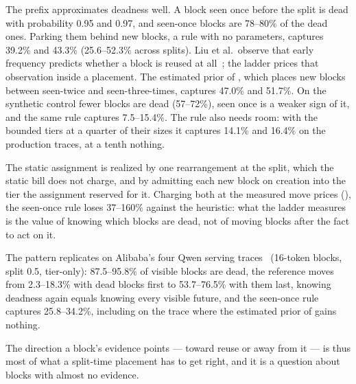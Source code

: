 The prefix approximates deadness well. A block seen once before the split is dead with probability 0.95 and
0.97, and seen-once blocks are 78--80\% of the dead ones. Parking them behind new blocks, a rule with no
parameters, captures 39.2\% and 43.3\% (25.6--52.3\% across splits). Liu et al.\ observe that early
frequency predicts whether a block is reused at all~\cite{liu2026fancyeviction}; the ladder prices that
observation inside a placement. The estimated prior of , which places new blocks
between seen-twice and seen-three-times, captures 47.0\% and 51.7\%. On the synthetic control fewer blocks
are dead (57--72\%), seen once is a weaker sign of it, and the same rule captures 7.5--15.4\%. The
rule also needs room: with the bounded tiers at a quarter of their sizes it captures 14.1\% and 16.4\% on
the production traces, at a tenth nothing.

The static assignment is realized by one rearrangement at the split, which the static bill does not
charge, and by admitting each new block on creation into the tier the assignment reserved for it.
Charging both at the measured move prices (), the seen-once rule loses 37--160\% against
the heuristic: what the ladder measures is the value of knowing which blocks are dead, not of moving
blocks after the fact to act on it.

The pattern replicates on Alibaba's four Qwen serving traces~\cite{wang2025kvcachewild} (16-token blocks,
split 0.5, tier-only): 87.5--95.8\% of visible blocks are dead, the reference moves from 2.3--18.3\% with
dead blocks first to 53.7--76.5\% with them last, knowing deadness again equals knowing every visible
future, and the seen-once rule captures 25.8--34.2\%, including on the trace where the estimated prior of
 gains nothing.

The direction a block's evidence points --- toward reuse or away from it --- is thus most of what a
split-time placement has to get right, and it is a question about blocks with almost no evidence.
